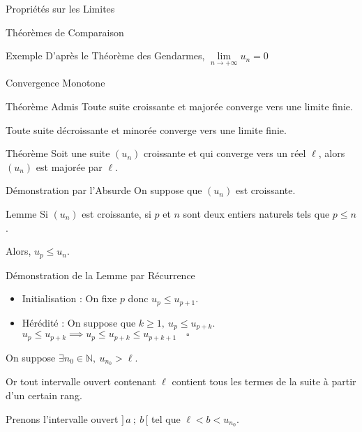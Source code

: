 \documentclass{cours}
\begin{document}
\begin{Gpartie}{Propriétés sur les Limites}
\begin{Spartie}{Théorèmes de Comparaison}
\begin{SSpartie}{Exemple}
                D'après le Théorème des Gendarmes, $\lim\limits_{n\to +\infty}u_n=0$
            \end{SSpartie}
        \end{Spartie}
        \pagebreak
        \begin{Spartie}{Convergence Monotone} 
            \begin{SSpartie}{Théorème Admis} 
                Toute suite croissante et majorée converge vers une limite finie.

                Toute suite décroissante et minorée converge vers une limite finie.
            \end{SSpartie}
            \begin{SSpartie}{Théorème} 
                Soit une suite $(u_n)$ croissante et qui converge vers un réel $\ell$, alors $(u_n)$ est majorée par $\ell$.
                \begin{SSSpartie}{Démonstration par l'Absurde} 
                    On suppose que $(u_n)$ est croissante.
                    \begin{SSSSpartie}{Lemme} 
                        Si $(u_n)$ est croissante, si $p$ et $n$ sont deux entiers naturels tels que $p\leq n$.

                        Alors, $u_p\leq u_n$.
                    \end{SSSSpartie}
                    \begin{SSSSpartie}{Démonstration de la Lemme par Récurrence}
                        \vspace{-1em}
                        \begin{itemize}
                            \item Initialisation : On fixe $p$ donc $u_p\leq u_{p+1}$.
                            \item Hérédité : On suppose que $k\geq 1,\ u_p\leq u_{p+k}$. \\
                            \phantom{Hérédité : }$u_p\leq u_{p+k}\implies u_p\leq u_{p+k}\leq u_{p+k+1}\quad\square$
                        \end{itemize}   
                    \end{SSSSpartie}
                    On suppose $\exists n_0\in\mathbb{N},\ u_{n_0}>\ell$.

                    Or tout intervalle ouvert contenant $\ell$ contient tous les termes de la suite à partir d'un certain rang.

                    Prenons l'intervalle ouvert $\big]\,a~;~b\,\big[$ tel que $\ell<b<u_{n_0}$.


\end{SSSpartie}
\end{SSpartie}
\end{Spartie}
\end{Gpartie}
\end{document}
